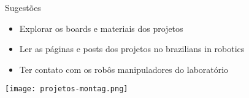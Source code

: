 \begin{frame}[c]{} 
   
    \begin{center}
    \end{center}
       
\end{frame}
%
\begin{frame}[t]{Sugestões} 

    
    \vspace*{0.3cm}
    \begin{itemize}
        \item Explorar os boards e materiais dos projetos
        \item Ler as páginas e posts dos projetos no brazilians in robotics
        \item Ter contato com os robôs manipuladores do laboratório
    \end{itemize}
    \vspace*{0.8cm}
    \texttt{[image: projetos-montag.png]}
\end{frame}
